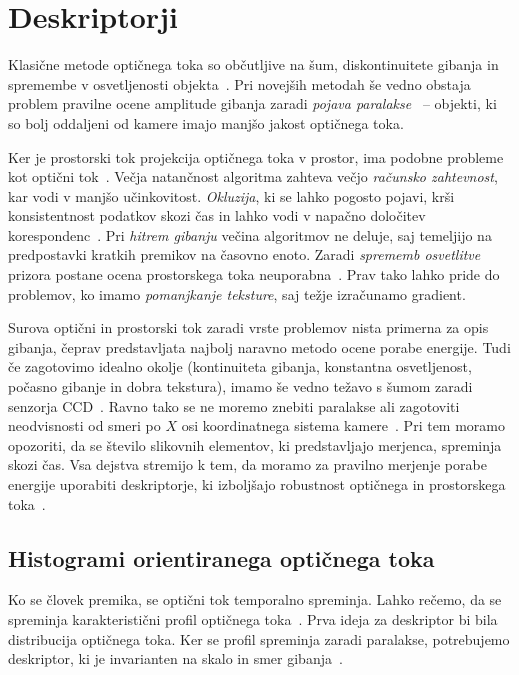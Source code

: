 \section{Deskriptorji}
Klasične metode optičnega toka so občutljive na šum, diskontinuitete gibanja in spremembe v osvetljenosti objekta~\cite{brox2011large}. Pri novejših metodah še vedno obstaja problem pravilne ocene amplitude gibanja zaradi \emph{pojava paralakse}~\cite{xu2012scale} -- objekti, ki so bolj oddaljeni od kamere imajo manjšo jakost optičnega toka. 


Ker je prostorski tok projekcija optičnega toka v prostor, ima podobne probleme kot optični tok~\cite{yan2016scene}. Večja natančnost algoritma zahteva večjo \emph{računsko zahtevnost}, kar vodi v manjšo učinkovitost. \emph{Okluzija}, ki se lahko pogosto pojavi, krši konsistentnost podatkov skozi čas in lahko vodi v napačno določitev korespondenc~\cite{yan2016scene}. Pri \emph{hitrem gibanju} večina algoritmov ne deluje, saj temeljijo na predpostavki kratkih premikov na časovno enoto. Zaradi \emph{sprememb osvetlitve} prizora postane ocena prostorskega toka neuporabna~\cite{yan2016scene}. Prav tako lahko pride do problemov, ko imamo \emph{pomanjkanje teksture}, saj težje izračunamo gradient.

Surova optični in prostorski tok zaradi vrste problemov nista primerna za opis gibanja, čeprav predstavljata najbolj naravno metodo ocene porabe energije. Tudi če zagotovimo idealno okolje (kontinuiteta gibanja, konstantna osvetljenost, počasno gibanje in dobra tekstura), imamo še vedno težavo s šumom zaradi senzorja CCD~\cite{wedel2011stereo}. Ravno tako se ne moremo znebiti paralakse ali zagotoviti neodvisnosti od smeri po $X$ osi koordinatnega sistema kamere~\cite{chaudhry2009histograms}. Pri tem moramo opozoriti, da se število slikovnih elementov, ki predstavljajo merjenca, spreminja skozi čas. Vsa dejstva stremijo k tem, da moramo za pravilno merjenje porabe energije uporabiti deskriptorje, ki izboljšajo robustnost optičnega in prostorskega toka~\cite{chaudhry2009histograms}. 







\subsection{Histogrami orientiranega optičnega toka}\label{sec:hoof}
Ko se človek premika, se optični tok temporalno spreminja. Lahko rečemo, da se spreminja karakteristični profil optičnega toka~\cite{chaudhry2009histograms}. Prva ideja za deskriptor bi bila distribucija optičnega toka. Ker se profil spreminja zaradi paralakse, potrebujemo deskriptor, ki je invarianten na skalo in smer gibanja~\cite{chaudhry2009histograms}.

